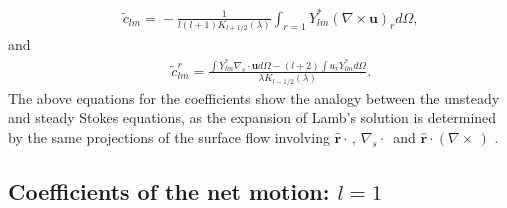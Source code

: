 \documentclass[aps,prx,twocolumn,amsmath,amssymb,amsfonts]{revtex4-2}
\begin{document}
\begin{eqnarray}&&\!\!\!\!\!\!\!\!\!\!\!\!
{\tilde c}_{lm}\!=\!-\frac{1}{l(l+1)K_{l+1/2}(\lambda)}\int_{r=1} Y_{lm}^* (\nabla\!\times\! \bm u)_r   d\Omega, \label{coex}
\end{eqnarray}
and
\begin{eqnarray}&&
{\tilde c}^{r}_{lm} \!=\!\frac{\int  Y_{lm}^* \nabla_s\cdot\bm u d\Omega-(l+2)\int u_r Y_{lm}^* d\Omega}{\lambda K_{l-1/2}(\lambda)}
. \label{tild}
\end{eqnarray}
The above equations for the coefficients show the analogy between the unsteady and steady Stokes equations, as the expansion of Lamb's solution is determined by the same projections of the surface flow involving $\hat{\bm r}\cdot\,$, $\nabla_s \cdot\,$ and $\hat{\bm r}\cdot (\nabla\times\,)$ \cite{kim}.

\subsection{Coefficients of the net motion: $l=1$} \label{sdq}
\end{document}
